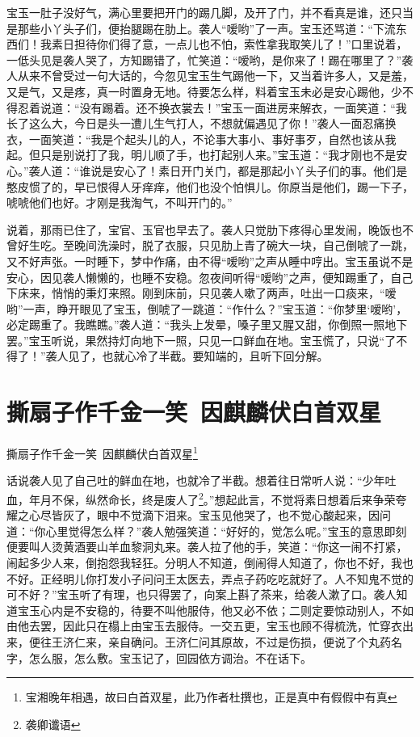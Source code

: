 \documentclass[12pt,oneside]{book}
\begin{document}
宝玉一肚子没好气，满心里要把开门的踢几脚，及开了门，并不看真是谁，还只当是那些小丫头子们，便抬腿踢在肋上。袭人“嗳哟”了一声。宝玉还骂道：“下流东西们！我素日担待你们得了意，一点儿也不怕，索性拿我取笑儿了！”口里说着，一低头见是袭人哭了，方知踢错了，忙笑道：“嗳哟，是你来了！踢在哪里了？”袭人从来不曾受过一句大话的，今忽见宝玉生气踢他一下，又当着许多人，又是羞，又是气，又是疼，真一时置身无地。待要怎么样，料着宝玉未必是安心踢他，少不得忍着说道：“没有踢着。还不换衣裳去！”宝玉一面进房来解衣，一面笑道：“我长了这么大，今日是头一遭儿生气打人，不想就偏遇见了你！”袭人一面忍痛换衣，一面笑道：“我是个起头儿的人，不论事大事小、事好事歹，自然也该从我起。但只是别说打了我，明儿顺了手，也打起别人来。”宝玉道：“我才刚也不是安心。”袭人道：“谁说是安心了！素日开门关门，都是那起小丫头子们的事。他们是憨皮惯了的，早已恨得人牙痒痒，他们也没个怕惧儿。你原当是他们，踢一下子，唬唬他们也好。才刚是我淘气，不叫开门的。”

说着，那雨已住了，宝官、玉官也早去了。袭人只觉肋下疼得心里发闹，晚饭也不曾好生吃。至晚间洗澡时，脱了衣服，只见肋上青了碗大一块，自己倒唬了一跳，又不好声张。一时睡下，梦中作痛，由不得“嗳哟”之声从睡中哼出。宝玉虽说不是安心，因见袭人懒懒的，也睡不安稳。忽夜间听得“嗳哟”之声，便知踢重了，自己下床来，悄悄的秉灯来照。刚到床前，只见袭人嗽了两声，吐出一口痰来，“嗳哟”一声，睁开眼见了宝玉，倒唬了一跳道：“作什么？”宝玉道：“你梦里‘嗳哟’，必定踢重了。我瞧瞧。”袭人道：“我头上发晕，嗓子里又腥又甜，你倒照一照地下罢。”宝玉听说，果然持灯向地下一照，只见一口鲜血在地。宝玉慌了，只说“了不得了！”袭人见了，也就心冷了半截。要知端的，且听下回分解。


 
\chapter{撕扇子作千金一笑~因麒麟伏白首双星}
撕扇子作千金一笑~因麒麟伏白首双星\footnote{宝湘晚年相遇，故曰白首双星，此乃作者杜撰也，正是真中有假假中有真}

话说袭人见了自己吐的鲜血在地，也就冷了半截。想着往日常听人说：“少年吐血，年月不保，纵然命长，终是废人了\footnote{袭卿谶语}。”想起此言，不觉将素日想着后来争荣夸耀之心尽皆灰了，眼中不觉滴下泪来。宝玉见他哭了，也不觉心酸起来，因问道：“你心里觉得怎么样？”袭人勉强笑道：“好好的，觉怎么呢。”宝玉的意思即刻便要叫人烫黄酒要山羊血黎洞丸来。袭人拉了他的手，笑道：“你这一闹不打紧，闹起多少人来，倒抱怨我轻狂。分明人不知道，倒闹得人知道了，你也不好，我也不好。正经明儿你打发小子问问王太医去，弄点子药吃吃就好了。人不知鬼不觉的可不好？”宝玉听了有理，也只得罢了，向案上斟了茶来，给袭人漱了口。袭人知道宝玉心内是不安稳的，待要不叫他服侍，他又必不依；二则定要惊动别人，不如由他去罢，因此只在榻上由宝玉去服侍。一交五更，宝玉也顾不得梳洗，忙穿衣出来，便往王济仁来，亲自确问。王济仁问其原故，不过是伤损，便说了个丸药名字，怎么服，怎么敷。宝玉记了，回园依方调治。不在话下。
\end{document}
